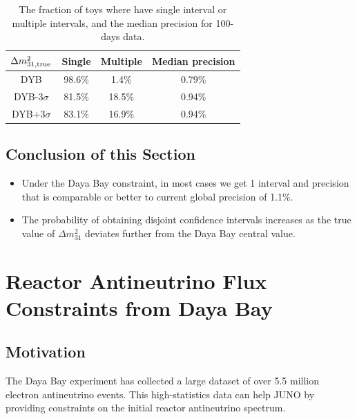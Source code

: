 \begin{table}[!ht]
    \centering
    \begin{tabular}{c|cc|c}
    \toprule
      $\Delta m^2_{31,\rm{true}}$ & Single & Multiple & Median precision \\
    \midrule
      DYB & 98.6\% & 1.4\% & 0.79\% \\
      DYB-3$\sigma$ & 81.5\% & 18.5\% & 0.94\% \\
      DYB+3$\sigma$ & 83.1\% & 16.9\% & 0.94\% \\
    \bottomrule
    \end{tabular}
    \caption{The fraction of toys where have single interval or multiple intervals, and the median precision for 100-days data.}
    \label{tab:frac_interval_pre_100d}
\end{table}

\subsection{Conclusion of this Section}
\begin{itemize}
    \item Under the Daya Bay constraint, in most cases we get 1 interval and precision that is comparable or better to current global precision of 1.1\%. 
    \item The probability of obtaining disjoint confidence intervals increases as the true value of $\Delta m^2_{31}$ deviates further from the Daya Bay central value.
\end{itemize}


\section{Reactor Antineutrino Flux Constraints from Daya Bay}\label{sec:dybconstraints}

\subsection{Motivation}
The Daya Bay experiment has collected a large dataset of over 5.5 million electron antineutrino
events. This high-statistics data can help JUNO by providing constraints on the initial reactor
antineutrino spectrum.


